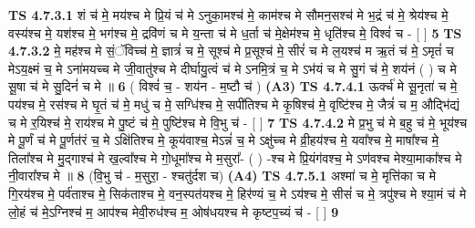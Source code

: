 \documentclass[17pt]{extarticle}
\begin{document}
                                        \textbf{ TS 4.7.3.1} \newline
                  शं च॑ मे॒ मय॑श्च मे प्रि॒यं च॑ मे ऽनुका॒मश्च॑ मे॒ काम॑श्च मे     सौमन॒सश्च॑ मे भ॒द्रं च॑ मे॒ श्रेय॑श्च मे॒ वस्य॑श्च मे॒   यश॑श्च मे॒ भग॑श्च मे॒ द्रवि॑णं च मे य॒न्ता च॑ मे ध॒र्ता च॑ मे॒क्षेम॑श्च मे॒ धृति॑श्च मे॒ विश्वं॑ च - [  ] \textbf{  5} \newline
                  \newline
                                \textbf{ TS 4.7.3.2} \newline
                  मे॒ मह॑श्च मे सं॒ॅविच्च॑ मे॒ ज्ञात्रं॑ च मे॒ सूश्च॑ मे प्र॒सूश्च॑ मे॒ सीरं॑ च मे ल॒यश्च॑ म ऋ॒तं च॑ मे॒ ऽमृतं॑ च मेऽय॒क्ष्मं च॒ मे ऽना॑मयच्च मे जी॒वातु॑श्च मे दीर्घायु॒त्वं च॑ मे ऽनमि॒त्रं च॒ मे ऽभ॑यं च मे सु॒गं च॑ मे॒ शय॑नं ( ) च मे सू॒षा च॑ मे सु॒दिनं॑ च मे ॥ \textbf{  6 } \newline
                  \newline
                      ( विश्वं॑ च॒ - शय॑न - म॒ष्टौ च॑ )  \textbf{(A3)} \newline \newline
                                        \textbf{ TS 4.7.4.1} \newline
                  ऊर्क्च॑ मे सू॒नृता॑ च मे॒ पय॑श्च मे॒ रस॑श्च मे घृ॒तं च॑ मे॒ मधु॑ च मे॒ सग्धि॑श्च मे॒ सपी॑तिश्च मे कृ॒षिश्च॑ मे॒ वृष्टि॑श्च मे॒ जैत्रं॑ च म॒ औद्भि॑द्यं च मे र॒यिश्च॑ मे॒ राय॑श्च मे पु॒ष्टं च॑ मे॒ पुष्टि॑श्च मे वि॒भु च॑ - [  ] \textbf{  7} \newline
                  \newline
                                \textbf{ TS 4.7.4.2} \newline
                  मे प्र॒भु च॑ मे ब॒हु च॑ मे॒ भूय॑श्च मे पू॒र्णं च॑ मे पू॒र्णत॑रं च॒ मे   ऽक्षि॑तिश्च मे॒ कूय॑वाश्च॒ मेऽन्नं॑ च॒ मे ऽक्षु॑च्च मे व्री॒हय॑श्च मे॒       यवा᳚श्च मे॒ माषा᳚श्च मे॒ तिला᳚श्च मे मु॒द्गाश्च॑ मे ख॒ल्वा᳚श्च मे गो॒धूमा᳚श्च मे म॒सुरा᳚- ( ) -श्च मे प्रि॒यंग॑वश्च॒ मे ऽण॑वश्च मेश्या॒माका᳚श्च मे नी॒वारा᳚श्च मे ॥ \textbf{  8 } \newline
                  \newline
                      (वि॒भु च॑ - म॒सुरा॒ - श्चतु॑र्दश च)  \textbf{(A4)} \newline \newline
                                        \textbf{ TS 4.7.5.1} \newline
                  अश्मा॑ च मे॒ मृत्ति॑का च मे गि॒रय॑श्च मे॒ पर्व॑ताश्च मे॒ सिक॑ताश्च मे॒     वन॒स्पत॑यश्च मे॒ हिर॑ण्यं च॒ मे ऽय॑श्च मे॒ सीसं॑ च मे॒ त्रपु॑श्च मे    श्या॒मं च॑ मे लो॒हं च॑ मे॒ऽग्निश्च॑ म॒ आप॑श्च मेवी॒रुध॑श्च म॒ ओष॑धयश्च मे कृष्टप॒च्यं च॑ - [  ] \textbf{  9} \newline
\end{document}
